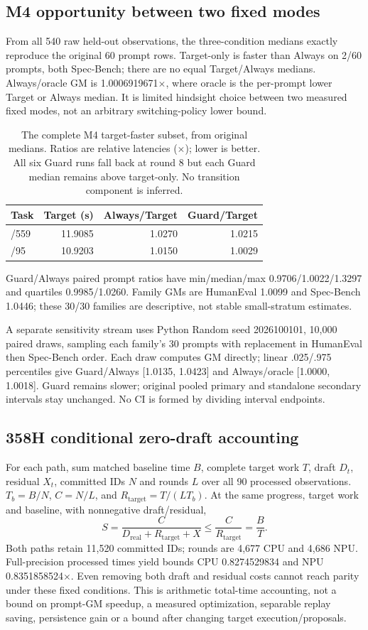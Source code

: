 \subsection{M4 opportunity between two fixed modes}
From all 540 raw held-out observations, the three-condition medians exactly reproduce the original 60 prompt rows. Target-only is faster than Always on 2/60 prompts, both Spec-Bench; there are no equal Target/Always medians. Always/oracle GM is 1.0006919671$\times$, where oracle is the per-prompt lower Target or Always median. It is limited hindsight choice between two measured fixed modes, not an arbitrary switching-policy lower bound.
\begin{table}[t]
\caption{The complete M4 target-faster subset, from original medians. Ratios are relative latencies ($\times$); lower is better. All six Guard runs fall back at round 8 but each Guard median remains above target-only. No transition component is inferred.}
\label{tab:m4opportunity}
\centering
\begin{tabular}{lrrr}
\toprule
Task & Target (s) & Always/Target & Guard/Target \\
\midrule
/559 & 11.9085 & 1.0270 & 1.0215 \\
/95 & 10.9203 & 1.0150 & 1.0029 \\
\bottomrule
\end{tabular}
\end{table}
Guard/Always paired prompt ratios have min/median/max 0.9706/1.0022/1.3297 and quartiles 0.9985/1.0260. Family GMs are HumanEval 1.0099 and Spec-Bench 1.0446; these 30/30 families are descriptive, not stable small-stratum estimates.

A separate sensitivity stream uses Python Random seed 2026100101, 10,000 paired draws, sampling each family's 30 prompts with replacement in HumanEval then Spec-Bench order. Each draw computes GM directly; linear .025/.975 percentiles give Guard/Always [1.0135, 1.0423] and Always/oracle [1.0000, 1.0018]. Guard remains slower; original pooled primary and standalone secondary intervals stay unchanged. No CI is formed by dividing interval endpoints.

\subsection{358H conditional zero-draft accounting}
For each path, sum matched baseline time $B$, complete target work $T$, draft $D_t$, residual $X_t$, committed IDs $N$ and rounds $L$ over all 90 processed observations. $T_b=B/N$, $C=N/L$, and $R_{\mathrm{target}}=T/(LT_b)$. At the same progress, target work and baseline, with nonnegative draft/residual,
\[
S=\frac{C}{D_{\mathrm{real}}+R_{\mathrm{target}}+X}
\le\frac{C}{R_{\mathrm{target}}}=\frac{B}{T}.
\]
Both paths retain 11,520 committed IDs; rounds are 4,677 CPU and 4,686 NPU. Full-precision processed times yield bounds CPU 0.8274529834 and NPU 0.8351858524$\times$. Even removing both draft and residual costs cannot reach parity under these fixed conditions. This is arithmetic total-time accounting, not a bound on prompt-GM speedup, a measured optimization, separable replay saving, persistence gain or a bound after changing target execution/proposals.

